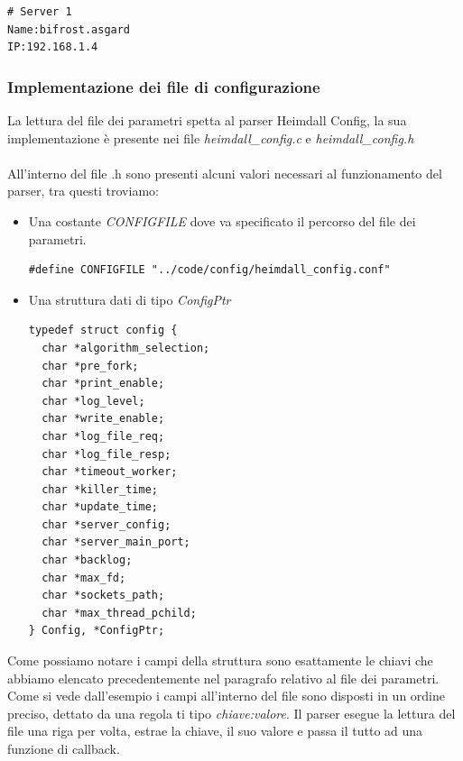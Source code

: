 \documentclass[italian]{tktltiki2}
\begin{document}
\begin{lstlisting}
# Server 1
Name:bifrost.asgard
IP:192.168.1.4
\end{lstlisting}

\subsubsection{Implementazione dei file di configurazione}
\label{ssec:file_config_impl}

La lettura del file dei parametri spetta al parser Heimdall Config, la sua implementazione è presente nei file \emph{heimdall\_config.c} e \emph{heimdall\_config.h} \\\\ All'interno del file .h sono presenti alcuni valori necessari al funzionamento del parser, tra questi troviamo:
\begin{itemize}

\item Una costante \emph{CONFIGFILE} dove va specificato il percorso del file dei parametri.
  
\begin{lstlisting}
#define CONFIGFILE "../code/config/heimdall_config.conf"
\end{lstlisting}
  
\item Una struttura dati di tipo \emph{ConfigPtr}

\begin{lstlisting}
typedef struct config {
  char *algorithm_selection;
  char *pre_fork;
  char *print_enable;
  char *log_level;
  char *write_enable;
  char *log_file_req;
  char *log_file_resp;
  char *timeout_worker;
  char *killer_time;
  char *update_time;
  char *server_config;
  char *server_main_port;
  char *backlog;
  char *max_fd;
  char *sockets_path;
  char *max_thread_pchild;
} Config, *ConfigPtr;  
\end{lstlisting}


\end{itemize}
Come possiamo notare i campi della struttura sono esattamente le chiavi che abbiamo elencato precedentemente nel paragrafo relativo al file dei parametri. Come si vede dall'esempio i campi all'interno del file sono disposti in un ordine preciso, dettato da una regola ti tipo \emph{chiave:valore}. Il parser esegue la lettura del file una riga per volta, estrae la chiave, il suo valore e passa il tutto ad una funzione di callback.
\end{document}

